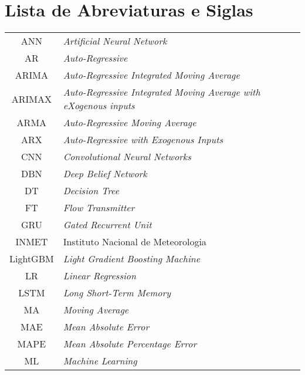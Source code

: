\newpage
{}
\section*{Lista de Abreviaturas e Siglas}



\begin{tabular}{cp{}}
	ANN & \textit{Artificial Neural Network} \\
	AR & \textit{Auto-Regressive}\\
	ARIMA & \textit{Auto-Regressive Integrated Moving Average} \\
	ARIMAX & \textit{Auto-Regressive Integrated Moving Average with eXogenous inputs}\\
	ARMA & \textit{Auto-Regressive Moving Average} \\
	ARX & \textit{Auto-Regressive with Exogenous Inputs}\\
	CNN & \textit{Convolutional Neural Networks}\\
	DBN & \textit{Deep Belief Network} \\
	DT & \textit{Decision Tree} \\
	FT & \textit{Flow Transmitter}\\
	GRU & \textit{Gated Recurrent Unit} \\
	INMET & Instituto Nacional de Meteorologia\\
	LightGBM & \textit{Light Gradient Boosting Machine} \\
	LR & \textit{Linear Regression}\\
	LSTM &\textit{Long Short-Term Memory}	\\
	MA & \textit{Moving Average}\\
	MAE & \textit{Mean Absolute Error}\\
	MAPE & \textit{Mean Absolute Percentage Error}\\
	ML & \textit{Machine Learning}	
\end{tabular}

